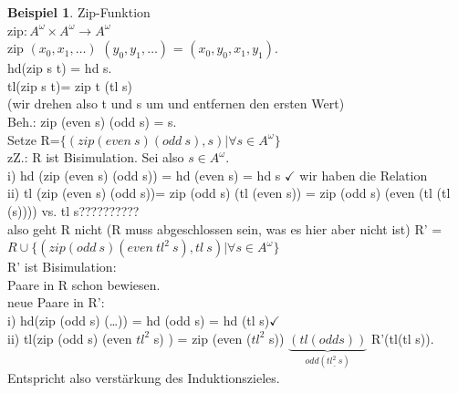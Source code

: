 \documentclass{article}
\theoremstyle{definition}
\newtheorem{beispiel}{Beispiel}[section]
\begin{document}
	\begin{beispiel} Zip-Funktion\\
	zip$:A^\omega\times A^\omega\to A^\omega$\\
	zip $(x_0,x_1,\dots)$ $(y_0,y_1,\dots)$ = $(x_0,y_0,x_1,y_1)$.\\
	hd(zip s t) = hd s.\\
	tl(zip s t)= zip t (tl s)\\
	(wir drehen also t und s um und entfernen den ersten Wert)\\
	Beh.: zip (even s) (odd s) = s.\\
	Setze R=$\{(zip(even\ s)(odd\ s),s)|\forall s\in A^\omega\}$\\
	zZ.: R ist Bisimulation. Sei also $s\in A^\omega$.\\
	i) hd (zip (even s) (odd s)) = hd (even s) = hd s $\checkmark$ wir haben die Relation\\
	ii) tl (zip (even s) (odd s))= zip (odd s) (tl (even s)) = zip (odd s) (even (tl (tl  (s)))) vs. tl s??????????\\
	also geht R nicht (R muss abgeschlossen sein, was es hier aber nicht ist)
	R' = $R\cup\{(zip (odd\ s) (even\ tl^2\ s), tl\ s)|\forall s\in A^\omega\}$\\
	R' ist Bisimulation:\\
	Paare in R schon bewiesen.\\
	neue Paare in R':\\
	i) hd(zip (odd s) (\dots)) = hd (odd s) = hd (tl s)$\checkmark$\\
	ii) tl(zip (odd s) (even $tl^2$ s) ) = zip (even ($tl^2$ s)) $\underbrace{(tl (odd s))}_{odd(\underline{tl^2\ s})}$ R'(tl(tl s))\checkmark.\\
	Entspricht also verstärkung des Induktionszieles.\\
	\end{beispiel}
\end{document}

